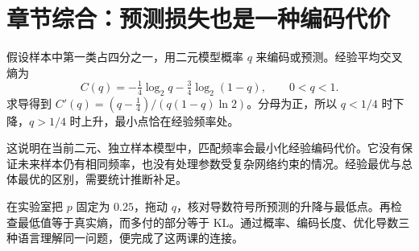 \section*{章节综合：预测损失也是一种编码代价}
假设样本中第一类占四分之一，用二元模型概率 $q$ 来编码或预测。经验平均交叉熵为
\[C(q)=-\tfrac14\log_2q-\tfrac34\log_2(1-q),\qquad 0<q<1.\]
求导得到 $C'(q)=(q-\frac14)/(q(1-q)\ln2)$。分母为正，所以 $q<1/4$ 时下降，$q>1/4$ 时上升，最小点恰在经验频率处。

这说明在当前二元、独立样本模型中，匹配频率会最小化经验编码代价。它没有保证未来样本仍有相同频率，也没有处理参数受复杂网络约束的情况。经验最优与总体最优的区别，需要统计推断补足。

在实验室把 $p$ 固定为 $0.25$，拖动 $q$，核对导数符号所预测的升降与最低点。再检查最低值等于真实熵，而多付的部分等于 KL。通过概率、编码长度、优化导数三种语言理解同一问题，便完成了这两课的连接。
